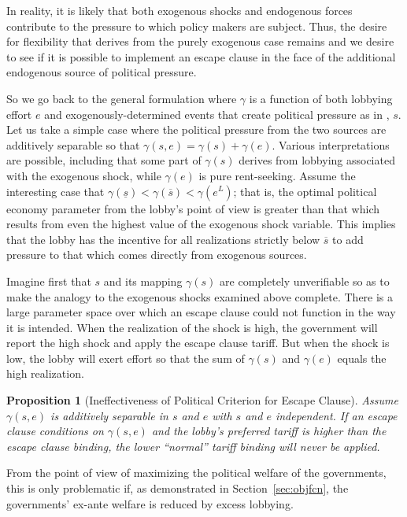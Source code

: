 \documentclass[12pt]{article}
\newtheorem{proposition}{Proposition}
\newcommand{\ov}{\overline}
\newcommand{\un}{\underline}
\newcommand{\ga}{\gamma}
\begin{document}
In reality, it is likely that both exogenous shocks and endogenous forces contribute to the pressure to which policy makers are subject. Thus, the desire for flexibility that derives from the purely exogenous case remains and we desire to see if it is possible to implement an escape clause in the face of the additional endogenous source of political pressure.

So we go back to the general formulation where $\ga$ is a function of both lobbying effort $e$ and exogenously-determined events that create political pressure as in \Textcite{ms2011}, $s$. Let us take a simple case where the political pressure from the two sources are additively separable so that $\ga(s,e) = \ga(s) + \ga(e)$. Various interpretations are possible, including that some part of $\ga(s)$ derives from lobbying associated with the exogenous shock, while $\ga(e)$ is pure rent-seeking. Assume the interesting case that $\ga(\un{s}) < \ga(\ov{s}) < \ga(e^L)$; that is, the optimal political economy parameter from the lobby's point of view is greater than that which results from even the highest value of the exogenous shock variable. This implies that the lobby has the incentive for all realizations strictly below $\ov{s}$ to add pressure to that which comes directly from exogenous sources.

Imagine first that $s$ and its mapping $\ga(s)$ are completely unverifiable so as to make the analogy to the exogenous shocks examined above complete. There is a large parameter space over which an escape clause could not function in the way it is intended. When the realization of the shock is high, the government will report the high shock and apply the escape clause tariff. But when the shock is low, the lobby will exert effort so that the sum of $\ga(s)$ and $\ga(e)$ equals the high realization.

\begin{proposition}[Ineffectiveness of Political Criterion for Escape Clause]
    Assume $\ga(s,e)$ is additively separable in $s$ and $e$ with $s$ and $e$ independent. If an escape clause conditions on $\ga(s,e)$ and the lobby's preferred tariff is higher than the escape clause binding, the lower ``normal'' tariff binding will never be applied.
\end{proposition}

From the point of view of maximizing the political welfare of the governments, this is only problematic if, as demonstrated in Section~\ref{sec:objfcn}, the governments' ex-ante welfare is reduced by excess lobbying.
\end{document}
